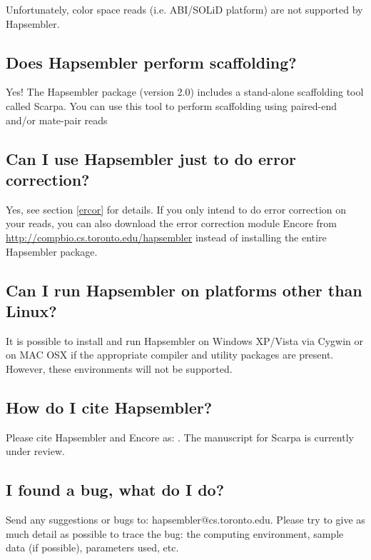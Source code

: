 \documentclass[12pt,a4paper]{report}
\begin{document}
Unfortunately, color space reads (i.e. ABI/SOLiD platform) are not supported by Hapsembler.

\subsection{Does Hapsembler perform scaffolding?}

Yes! The Hapsembler package (version 2.0) includes a stand-alone scaffolding tool called Scarpa. You can use this tool to perform scaffolding using paired-end and/or mate-pair reads

\subsection{Can I use Hapsembler just to do error correction?}

Yes, see section \ref{ercor} for details. If you only intend to do error correction on your reads, you can also download the error correction module Encore from \url{http://compbio.cs.toronto.edu/hapsembler} instead of installing the entire Hapsembler package.

\subsection{Can I run Hapsembler on platforms other than Linux?}

It is possible to install and run Hapsembler on Windows XP/Vista via Cygwin or on MAC OSX if the appropriate compiler and utility packages are present. However, these environments will not be supported.

\subsection{How do I cite Hapsembler?}

Please cite Hapsembler and Encore as: \cite{donmez2}. The manuscript for Scarpa is currently under review.

\subsection{I found a bug, what do I do?}

Send any suggestions or bugs to: hapsembler@cs.toronto.edu. Please try to give as much detail as possible to trace the bug: the computing environment, sample data (if possible), parameters used, etc.



\end{document}
